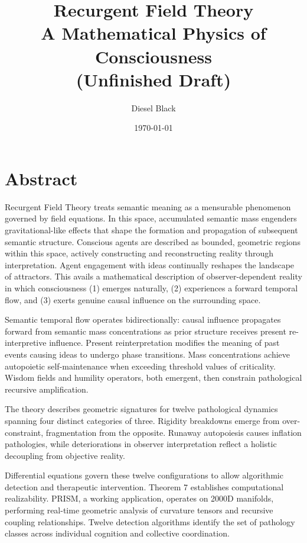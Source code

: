 \documentclass[11pt, a4paper]{report}
\title{Recurgent Field Theory \\ A Mathematical Physics of Consciousness \\ \small{(Unfinished Draft)}}
\author{Diesel Black}
\date{\today}
\begin{document}
\maketitle

\section*{Abstract}
Recurgent Field Theory treats semantic meaning as a mensurable phenomenon governed by field equations. In this space, accumulated semantic mass engenders gravitational-like effects that shape the formation and propagation of subsequent semantic structure. Conscious agents are described as bounded, geometric regions within this space, actively constructing and reconstructing reality through interpretation. Agent engagement with ideas continually reshapes the landscape of attractors. This avails a mathematical description of observer-dependent reality in which consciousness (1) emerges naturally, (2) experiences a forward temporal flow, and (3) exerts genuine causal influence on the surrounding space.

Semantic temporal flow operates bidirectionally: causal influence propagates forward from semantic mass concentrations as prior structure receives present re-interpretive influence. Present reinterpretation modifies the meaning of past events causing ideas to undergo phase transitions. Mass concentrations achieve autopoietic self-maintenance when exceeding threshold values of criticality. Wisdom fields and humility operators, both emergent, then constrain pathological recursive amplification.

The theory describes geometric signatures for twelve pathological dynamics spanning four distinct categories of three. Rigidity breakdowns emerge from over-constraint, fragmentation from the opposite. Runaway autopoiesis causes inflation pathologies, while deteriorations in observer interpretation reflect a holistic decoupling from objective reality.

Differential equations govern these twelve configurations to allow algorithmic detection and therapeutic intervention. Theorem 7 establishes computational realizability. PRISM, a working application, operates on 2000D manifolds, performing real-time geometric analysis of curvature tensors and recursive coupling relationships. Twelve detection algorithms identify the set of pathology classes across individual cognition and collective coordination.
\end{document}
